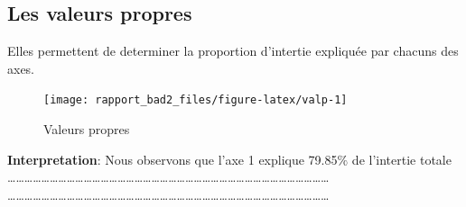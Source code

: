 \documentclass[
]{article}
\newenvironment{Shaded}{\begin{snugshade}}{\end{snugshade}}
\newcommand{\DataTypeTok}[1]{\textcolor[rgb]{0.13,0.29,0.53}{#1}}
\newcommand{\DecValTok}[1]{\textcolor[rgb]{0.00,0.00,0.81}{#1}}
\newcommand{\FloatTok}[1]{\textcolor[rgb]{0.00,0.00,0.81}{#1}}
\newcommand{\KeywordTok}[1]{\textcolor[rgb]{0.13,0.29,0.53}{\textbf{#1}}}
\newcommand{\NormalTok}[1]{#1}
\newcommand{\OperatorTok}[1]{\textcolor[rgb]{0.81,0.36,0.00}{\textbf{#1}}}
\newcommand{\StringTok}[1]{\textcolor[rgb]{0.31,0.60,0.02}{#1}}
\begin{document}
\hypertarget{les-valeurs-propres}{%
\subsection{\texorpdfstring{\textbf{Les valeurs
propres}}{Les valeurs propres}}\label{les-valeurs-propres}}

Elles permettent de determiner la proportion d'intertie expliquée par
chacuns des axes.

\begin{Shaded}
\end{Shaded}

\begin{figure}[h]

{\centering \texttt{[image: rapport\_bad2\_files/figure-latex/valp-1]} 

}

\caption{Valeurs propres}\label{fig:valp}
\end{figure}

\textbf{Interpretation}: Nous observons que l'axe 1 explique 79.85\(\%\)
de l'intertie totale\\
\ldots\ldots\ldots\ldots\ldots\ldots\ldots\ldots\ldots\ldots\ldots\ldots\ldots\ldots\ldots\ldots\ldots\ldots\ldots\ldots\ldots\ldots\ldots\ldots\ldots\ldots\ldots\ldots\ldots\ldots\ldots\ldots\ldots\ldots\ldots\ldots\ldots\ldots{}
\ldots\ldots\ldots\ldots\ldots\ldots\ldots\ldots\ldots\ldots\ldots\ldots\ldots\ldots\ldots\ldots\ldots\ldots\ldots\ldots\ldots\ldots\ldots\ldots\ldots\ldots\ldots\ldots\ldots\ldots\ldots\ldots\ldots\ldots\ldots\ldots\ldots\ldots{}
\end{document}
